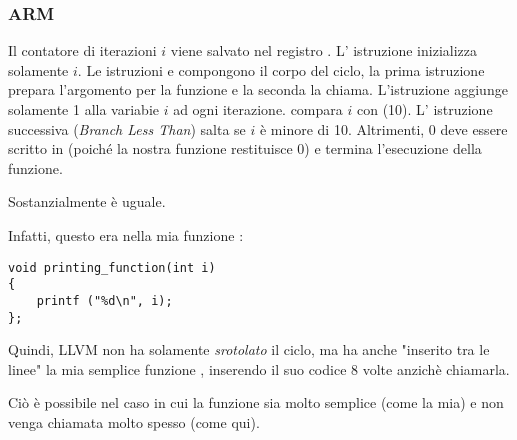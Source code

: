 \subsubsection{ARM}

\myparagraph{\NonOptimizingKeilVI (\ARMMode)}



Il contatore di iterazioni $i$ viene salvato nel registro .
L' istruzione  inizializza solamente $i$.
Le istruzioni  e 
compongono il corpo del ciclo, la prima istruzione prepara l'argomento per la funzione 
\ttf e la seconda la chiama.
L'istruzione  aggiunge solamente 1 alla variabie $i$ ad ogni iterazione.
 compara $i$ con  (10). 
L' istruzione successiva  (\emph{Branch Less Than}) salta se $i$ è minore di 10.
Altrimenti, 0 deve essere scritto in  (poiché la nostra funzione restituisce 0)
e termina l'esecuzione della funzione.

\myparagraph{\OptimizingKeilVI (\ThumbMode)}



Sostanzialmente è uguale.

\myparagraph{\OptimizingXcodeIV (\ThumbTwoMode)}
\label{ARM_unrolled_loops}



Infatti, questo era nella mia funzione \ttf:

\begin{lstlisting}[style=customc]
void printing_function(int i)
{
    printf ("%d\n", i);
};
\end{lstlisting}

Quindi, LLVM non ha solamente \emph{srotolato} il ciclo, 
ma ha anche "inserito tra le linee" la mia
semplice funzione \ttf,
inserendo il suo codice 8 volte anzichè chiamarla. 

Ciò è possibile nel caso in cui la funzione sia molto semplice (come la mia) e non venga chiamata molto spesso (come qui).






